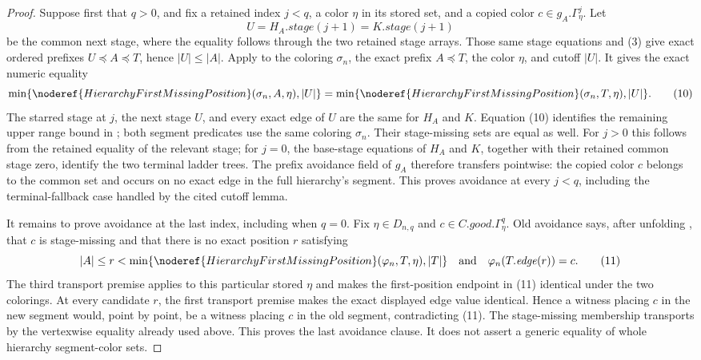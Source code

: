 \begin{proof}
Suppose first that \(q>0\), and fix a retained index \(j<q\), a color
\(\eta\) in its stored set, and a copied color
\(c\in g_A.\Gamma^j_\eta\).  Let
\[
 U=H_A.\mathit{stage}(j+1)=K.\mathit{stage}(j+1)
\]
be the common next stage, where the equality follows through the two
retained stage arrays.  Those same stage equations and (3) give exact
ordered prefixes \(U\preccurlyeq A\preccurlyeq T\), hence
\(|U|\leq|A|\).  Apply
 to the coloring
\(\sigma_n\), the exact prefix \(A\preccurlyeq T\), the color \(\eta\),
and cutoff \(|U|\).  It gives the exact numeric equality
\[
 \min\{\noderef{HierarchyFirstMissingPosition}
          (\sigma_n,A,\eta),|U|\}
 =
 \min\{\noderef{HierarchyFirstMissingPosition}
          (\sigma_n,T,\eta),|U|\}.                              \tag{10}
\]
The starred stage at \(j\), the next stage \(U\), and every exact edge
of \(U\) are the same for \(H_A\) and \(K\).  Equation (10) identifies
the remaining upper range bound in
; both segment predicates use the same
coloring \(\sigma_n\).  Their stage-missing sets are equal as well.  For
\(j>0\) this follows from the retained equality of the relevant stage;
for \(j=0\), the base-stage equations of \(H_A\) and \(K\), together with
their retained common stage zero, identify the two terminal ladder trees.
The prefix avoidance field of \(g_A\) therefore transfers pointwise: the
copied color \(c\) belongs to the common
 set and occurs on no exact edge in
the full hierarchy's segment.  This proves avoidance at every \(j<q\),
including the terminal-fallback case handled by the cited cutoff lemma.

It remains to prove avoidance at the last index, including when \(q=0\).
Fix \(\eta\in D_{n,q}\) and
\(c\in C.\mathit{good}.\Gamma^q_\eta\).  Old avoidance says, after
unfolding , that \(c\) is stage-missing
and that there is no exact position \(r\) satisfying
\[
 |A|\leq r<\min\{
 \noderef{HierarchyFirstMissingPosition}(\varphi_n,T,\eta),|T|\}
 \quad\text{and}\quad \varphi_n(T.\mathit{edge}(r))=c.         \tag{11}
\]
The third transport premise applies to this particular stored \(\eta\)
and makes the first-position endpoint in (11) identical under the two
colorings.  At every candidate \(r\), the first transport premise makes
the exact displayed edge value identical.  Hence a witness placing \(c\)
in the new segment would, point by point, be a witness placing \(c\) in
the old segment, contradicting (11).  The stage-missing membership
transports by the vertexwise equality already used above.  This proves
the last avoidance clause.  It does not assert a generic equality of
whole hierarchy segment-color sets.


\end{proof}
